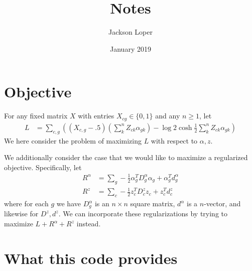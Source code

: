 \documentclass{article}
\begin{document}
\title{Notes}

\author{Jackson Loper}

\date{January 2019}

\maketitle

\section{Objective}

For any fixed matrix $X$ with entries $X_{cg}\in \{0,1\}$ and any $n\geq1$, let
\begin{align*}
L &= \sum_{c,g} \left((X_{c,g}-.5)\left(\sum_k^n Z_{ck} \alpha_{gk}\right) - \log 2 \cosh \frac{1}{2}\sum_k^n Z_{ck} \alpha_{gk}\right)
\end{align*}
We here consider the problem of maximizing $L$ with respect to $\alpha,z$.  

We additionally consider the case that we would like to maximize a regularized objective.  Specifically, let 
\begin{align*}
R^\alpha &= \sum_g-\frac{1}{2}\alpha_g ^T D^\alpha_g \alpha_g + \alpha_g^Td^\alpha_g\\
R^z &= \sum_c-\frac{1}{2}z_c ^T D^z_c z_c + z_c^Td^z_c
\end{align*}
where for each $g$ we have $D^\alpha_g$ is an $n\times n$ square matrix, $d^\alpha$ is a $n$-vector, and likewise for $D^z,d^z$.  We can incorporate these regularizations by trying to maximize $L+R^\alpha+R^z$ instead.

\section{What this code provides}
\end{document}
